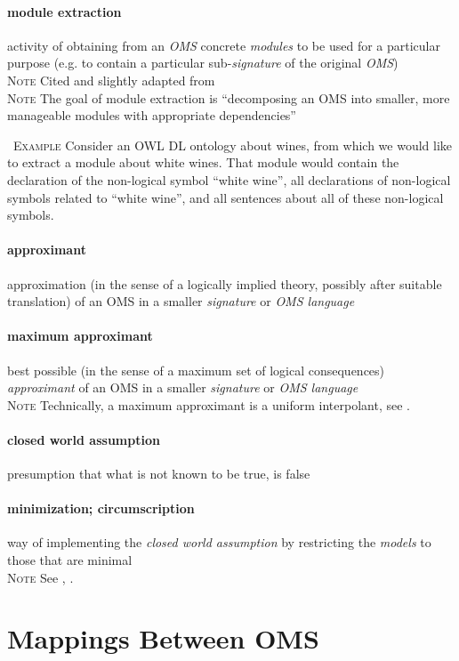 \documentclass[10pt,%
\ifpretendfinal
final%
\else
draft%
\fi,
]{scrreprt}
\makeatletter
\newcommand*{\eg}{e.g.\@\xspace}
\newcommand*{\termref}[1]{\textit{#1}}
\newcommand*{\synonym}{; }
\newcommand{\sclause}[1]{\section{#1}}
\newcommand{\termdefinition}[2]{\paragraph{#1} #2}
\newenvironment{definitions}[0]{\medskip }{}
\newenvironment{note}[0]{\ \\ \textsc{Note} \quad}{}
\newenvironment{example}[0]{\ \newline \textsc{Example}\quad }{}
\makeatother
\begin{document}
\begin{definitions}
  \termdefinition{module extraction}{activity of obtaining from an \termref{OMS} concrete \termref{modules} to be used for a particular purpose (\eg to contain a particular sub-\termref{signature} of the original \termref{OMS})}
  \begin{note}
    Cited and slightly adapted from \cite{SuarezFigueroaEtAl:OntologyGlossary2008}
  \end{note}
  \begin{note}
    The goal of module extraction is ``decomposing an OMS into smaller, more manageable modules with appropriate dependencies'' \cite{DBLP:series/lncs/5445}
  \end{note}

  \begin{example}
    Consider an OWL DL ontology about wines, from which we would like to extract a module about white wines. That module would contain the declaration of the non-logical symbol ``white wine'', all declarations of non-logical symbols related to ``white wine'', and all sentences about all of these non-logical symbols.
  \end{example}


\termdefinition{approximant}{approximation (in the sense of a logically implied theory, possibly after
suitable translation) 
of an OMS in a smaller \termref{signature} or
\termref{OMS language}}
\termdefinition{maximum approximant}{
best possible (in the sense of a maximum set of logical consequences)
\termref{approximant} of an OMS in a smaller \termref{signature} or \termref{OMS language}}
\begin{note}
 Technically, a maximum approximant is a uniform interpolant, see \cite{DBLP:conf/ijcai/LutzW11}.
\end{note}


\termdefinition{closed world assumption}{presumption that what is
    not known to be true, is false}

\termdefinition{minimization\synonym circumscription}
{way of implementing the \termref{closed world assumption} by restricting the \termref{models} to those that are minimal}
  \begin{note}
    See \cite{circ1}, \cite{circ2}.
  \end{note}

\sclause{Mappings Between OMS}


\end{definitions}
\end{document}
